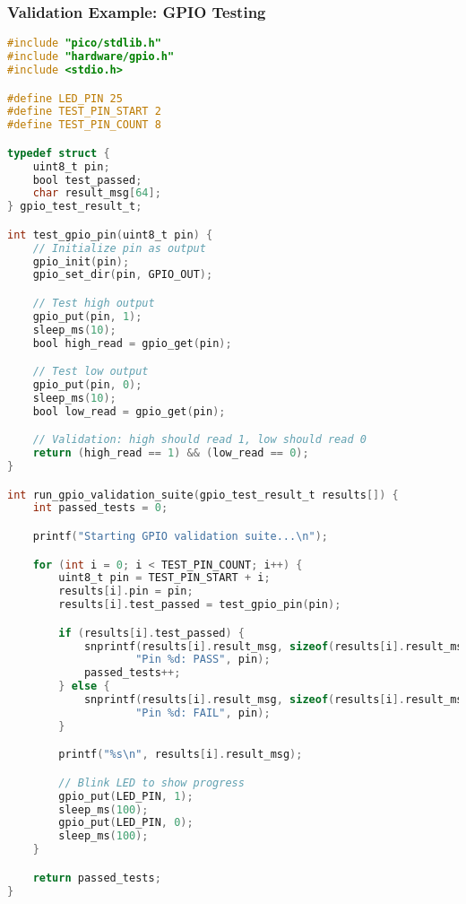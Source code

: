 \documentclass{beamer}
\begin{document}
\begin{frame}[fragile]
\frametitle{Validation Example: GPIO Testing}
\begin{lstlisting}[language=C, basicstyle=\tiny]
#include "pico/stdlib.h"
#include "hardware/gpio.h"
#include <stdio.h>

#define LED_PIN 25
#define TEST_PIN_START 2
#define TEST_PIN_COUNT 8

typedef struct {
    uint8_t pin;
    bool test_passed;
    char result_msg[64];
} gpio_test_result_t;

int test_gpio_pin(uint8_t pin) {
    // Initialize pin as output
    gpio_init(pin);
    gpio_set_dir(pin, GPIO_OUT);

    // Test high output
    gpio_put(pin, 1);
    sleep_ms(10);
    bool high_read = gpio_get(pin);

    // Test low output
    gpio_put(pin, 0);
    sleep_ms(10);
    bool low_read = gpio_get(pin);

    // Validation: high should read 1, low should read 0
    return (high_read == 1) && (low_read == 0);
}

int run_gpio_validation_suite(gpio_test_result_t results[]) {
    int passed_tests = 0;

    printf("Starting GPIO validation suite...\n");

    for (int i = 0; i < TEST_PIN_COUNT; i++) {
        uint8_t pin = TEST_PIN_START + i;
        results[i].pin = pin;
        results[i].test_passed = test_gpio_pin(pin);

        if (results[i].test_passed) {
            snprintf(results[i].result_msg, sizeof(results[i].result_msg),
                    "Pin %d: PASS", pin);
            passed_tests++;
        } else {
            snprintf(results[i].result_msg, sizeof(results[i].result_msg),
                    "Pin %d: FAIL", pin);
        }

        printf("%s\n", results[i].result_msg);

        // Blink LED to show progress
        gpio_put(LED_PIN, 1);
        sleep_ms(100);
        gpio_put(LED_PIN, 0);
        sleep_ms(100);
    }

    return passed_tests;
}
\end{lstlisting}
\end{frame}
\end{document}
